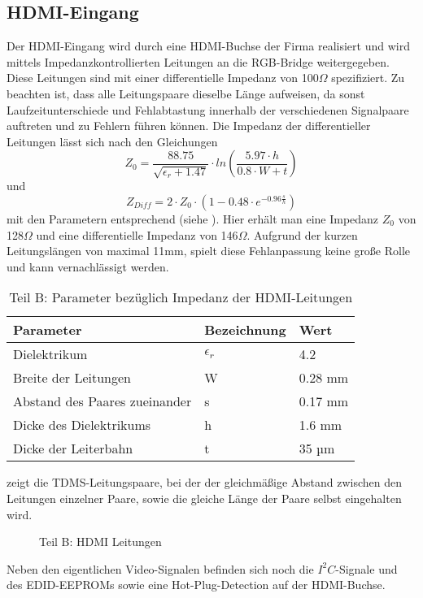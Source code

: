 \subsection{HDMI-Eingang}
Der HDMI-Eingang wird durch eine HDMI-Buchse der Firma  realisiert und wird mittels Impedanzkontrollierten Leitungen an die RGB-Bridge weitergegeben. Diese Leitungen sind mit einer differentielle Impedanz von 100$\Omega$ spezifiziert. Zu beachten ist, dass alle Leitungspaare dieselbe Länge aufweisen, da sonst Laufzeitunterschiede und Fehlabtastung innerhalb der verschiedenen Signalpaare auftreten und zu Fehlern führen können. Die Impedanz der differentieller Leitungen lässt sich nach den Gleichungen 
%
\begin{equation}
Z_0 = \frac{88.75}{\sqrt{\epsilon_r + 1.47}} \cdot ln\left(\frac{5.97 \cdot h}{0.8 \cdot W + t}\right)
\label{equ:z_0}
\end{equation}
%
und
%
\begin{equation}
Z_{Diff} = 2 \cdot Z_0  \cdot \left(1-0.48 \cdot e^{-0.96\frac{s}{h}}\right)
\label{equ:z_diff}
\end{equation}
%
mit den Parametern entsprechend  (siehe \cite{TI2007}). Hier erhält man eine Impedanz $Z_0$ von 128$\Omega$ und eine differentielle Impedanz von 146$\Omega$. Aufgrund der kurzen Leitungslängen von maximal 11mm, spielt diese Fehlanpassung keine große Rolle und kann vernachlässigt werden.
\begin{table}[h]
\begin{tabular}{|p{7cm}|p{3cm}|p{3cm}|}\hline
\rowcolor{TableBackgroundColor} 
   \textbf{Parameter} & \textbf{Bezeichnung} & \textbf{Wert}	\\ \hline
    Dielektrikum 					& $\epsilon_r$	& 4.2		\\ \hline
	Breite der Leitungen  		 	& W 			& 0.28 mm	\\ \hline
	Abstand des Paares zueinander 	& s 			& 0.17 mm 	\\ \hline
	Dicke des Dielektrikums 		& h 			& 1.6 mm 	\\ \hline 
	Dicke der Leiterbahn 			& t 			& 35 µm		\\ \hline 
\end{tabular}
\caption{Teil B: Parameter bezüglich Impedanz der HDMI-Leitungen}
\label{tab:z_parameter}
\end{table}
 zeigt die TDMS-Leitungspaare, bei der der gleichmäßige Abstand zwischen den Leitungen einzelner Paare, sowie die gleiche Länge der Paare selbst eingehalten wird. 
\begin{figure}[htp]
	\centering
{}
	\caption{Teil B: HDMI Leitungen}
	\label{fig:hdmi_leitungen}
\end{figure}
Neben den eigentlichen Video-Signalen befinden sich noch die $I^2C$-Signale  und  des EDID-EEPROMs sowie eine Hot-Plug-Detection auf der HDMI-Buchse.

